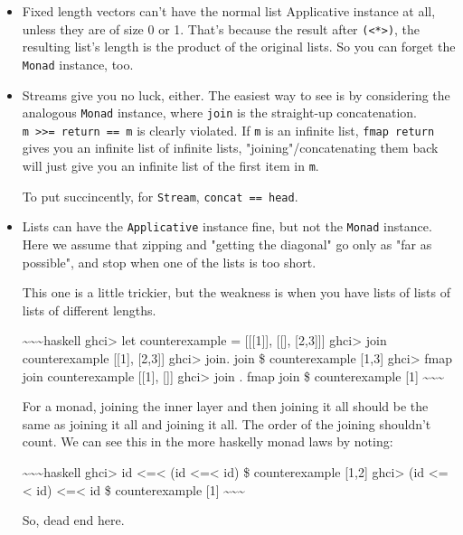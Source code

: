 \documentclass[]{article}
\begin{document}
\begin{itemize}
\item
  Fixed length vectors can't have the normal list Applicative instance at all,
  unless they are of size 0 or 1. That's because the result after
  \texttt{(\textless{}*\textgreater{})}, the resulting list's length is the
  product of the original lists. So you can forget the \texttt{Monad} instance,
  too.
\item
  Streams give you no luck, either. The easiest way to see is by considering the
  analogous \texttt{Monad} instance, where \texttt{join} is the straight-up
  concatenation. \texttt{m\ \textgreater{}\textgreater{}=\ return\ ==\ m} is
  clearly violated. If \texttt{m} is an infinite list, \texttt{fmap\ return}
  gives you an infinite list of infinite lists, "joining"/concatenating them
  back will just give you an infinite list of the first item in \texttt{m}.

  To put succincently, for \texttt{Stream}, \texttt{concat\ ==\ head}.
\item
  Lists can have the \texttt{Applicative} instance fine, but not the
  \texttt{Monad} instance. Here we assume that zipping and "getting the
  diagonal" go only as "far as possible", and stop when one of the lists is too
  short.

  This one is a little trickier, but the weakness is when you have lists of
  lists of lists of different lengths.

  \textasciitilde{}\textasciitilde{}\textasciitilde{}haskell ghci\textgreater{}
  let counterexample = {[}{[}{[}1{]}{]}, {[}{[}{]}, {[}2,3{]}{]}{]}
  ghci\textgreater{} join counterexample {[}{[}1{]}, {[}2,3{]}{]}
  ghci\textgreater{} join. join \$ counterexample {[}1,3{]} ghci\textgreater{}
  fmap join counterexample {[}{[}1{]}, {[}{]}{]} ghci\textgreater{} join . fmap
  join \$ counterexample {[}1{]}
  \textasciitilde{}\textasciitilde{}\textasciitilde{}

  For a monad, joining the inner layer and then joining it all should be the
  same as joining it all and joining it all. The order of the joining shouldn't
  count. We can see this in the more haskelly monad laws by noting:

  \textasciitilde{}\textasciitilde{}\textasciitilde{}haskell ghci\textgreater{}
  id \textless{}=\textless{} (id \textless{}=\textless{} id) \$ counterexample
  {[}1,2{]} ghci\textgreater{} (id \textless{}=\textless{} id)
  \textless{}=\textless{} id \$ counterexample {[}1{]}
  \textasciitilde{}\textasciitilde{}\textasciitilde{}

  So, dead end here.
\end{itemize}
\end{document}
